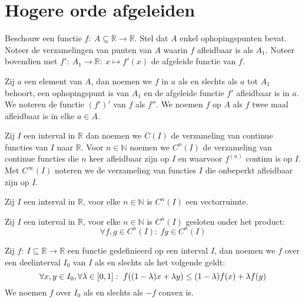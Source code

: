 \documentclass[main.tex]{subfiles}
\begin{document}
\section{Hogere orde afgeleiden}
\label{sec:hogere-orde-afgel}

\begin{de}
  Beschouw een functie $f:\ A \subseteq \mathbb{R} \rightarrow \mathbb{R}$.
  Stel dat $A$ enkel ophopingspunten bevat.
  Noteer de verzamelingen van punten van $A$ waarin $f$ afleidbaar is als $A_{1}$.
  Noteer bovendien met $f':\ A_{1} \rightarrow \mathbb{R}:\ x \mapsto f'(x)$ de afgeleide functie van $f$.

  Zij $a$ een element van $A$, dan noemen we $f$  in $a$ als en slechts als $a$ tot $A_{1}$ behoort, een ophopingspunt is van $A_{1}$ en de afgeleide functie $f'$ afleidbaar is in $a$.
  We noteren de  functie $(f')'$ van $f$ als $f''$.
  We noemen $f$  op $A$ als $f$ twee maal afleidbaar is in elke $a\in A$.
\end{de}

\begin{de}
  Zij $I$ een interval in $\mathbb{R}$ dan noemen we $C(I)$ de verzameling van continue functies van $I$ naar $\mathbb{R}$.
  Voor $n\in \mathbb{N}$ noemen we $C^{n}(I)$ de verzameling van continue functies die $n$ keer afleidbaar zijn op $I$ en waarvoor $f^{(n)}$ continu is op $I$.
  Met $C^{\infty}(I)$ noteren we de verzameling van functies $I$ die onbeperkt afleidbaar zijn op $I$.
\end{de}

\begin{st}
  Zij $I$ een interval in $\mathbb{R}$, voor elke $n\in \mathbb{N}$ is $C^{n}(I)$ een vectorruimte.
\end{st}

\begin{st}
  Zij $I$ een interval in $\mathbb{R}$, voor elke $n\in \mathbb{N}$ is $C^{n}(I)$ gesloten onder het product:
  \[ \forall f,g \in C^{n}(I):\ fg \in C^{n}(I) \]
\end{st}

\begin{de}
  Zij $f:\ I \subseteq \mathbb{R} \rightarrow \mathbb{R}$ een functie gedefinieerd op een interval $I$, dan noemen we $f$  over een deelinterval $I_{0}$ van $I$ als en slechts als het volgende geldt:
  \[ \forall x,y \in I_{0}, \forall \lambda \in \interval{0}{1}:\ f((1-\lambda)x+\lambda y) \le (1-\lambda)f(x) + \lambda f(y)\]
  We noemen $f$  over $I_{0}$ als en slechts als $-f$ convex is.
\end{de}
\end{document}
